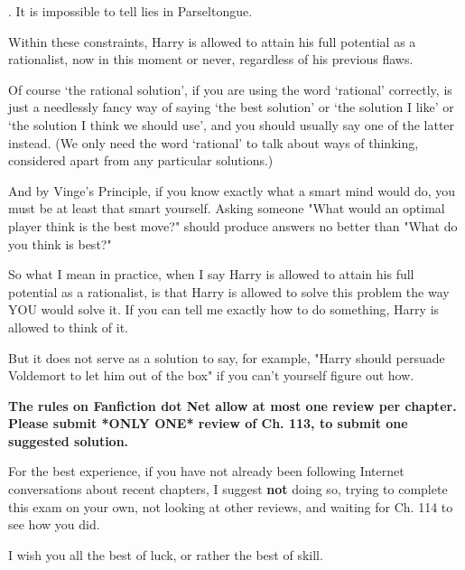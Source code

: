 \vspace*{.5\baselineskip}. It is impossible to tell lies in Parseltongue.

\vspace*{.5\baselineskip}\noindent
Within these constraints,
Harry is allowed to attain his full potential as a rationalist,
now in this moment or never,
regardless of his previous flaws.

\vspace*{.5\baselineskip}\noindent
Of course `the rational solution',
if you are using the word `rational' correctly,
is just a needlessly fancy way of saying `the best solution'
or `the solution I like' or `the solution I think we should use',
and you should usually say one of the latter instead.
(We only need the word `rational' to talk about ways of thinking,
considered apart from any particular solutions.)

\vspace*{.5\baselineskip}\noindent
And by Vinge's Principle,
if you know exactly what a smart mind would do,
you must be at least that smart yourself.
Asking someone "What would an optimal player think is the best move?"
should produce answers no better than "What do you think is best?"

\vspace*{.5\baselineskip}\noindent
So what I mean in practice,
when I say Harry is allowed to attain his full potential as a
rationalist,
is that Harry is allowed to solve this problem
the way YOU would solve it.
If you can tell me exactly how to do something,
Harry is allowed to think of it.

\vspace*{.5\baselineskip}\noindent
But it does not serve as a solution to say, for example,
"Harry should persuade Voldemort to let him out of the box"
if you can't yourself figure out how.

\vspace*{.5\baselineskip}\noindent
\textbf{The rules on Fanfiction dot Net allow at most one review per
chapter.
Please submit *ONLY ONE* review of Ch. 113,
to submit one suggested solution.}

\vspace*{.5\baselineskip}\noindent
For the best experience, if you have not already been following
Internet conversations about recent chapters, I suggest
\textbf{not} doing so,
trying to complete this exam on your own,
not looking at other reviews,
and waiting for Ch. 114 to see how you did.

\vspace*{.5\baselineskip}\noindent
I wish you all the best of luck, or rather the best of skill.

